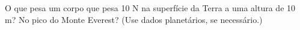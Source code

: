 O que pesa um corpo que pesa 10 N na superfície da Terra a uma altura de 10 m? No pico do Monte Everest? (Use dados planetários, se necessário.)

